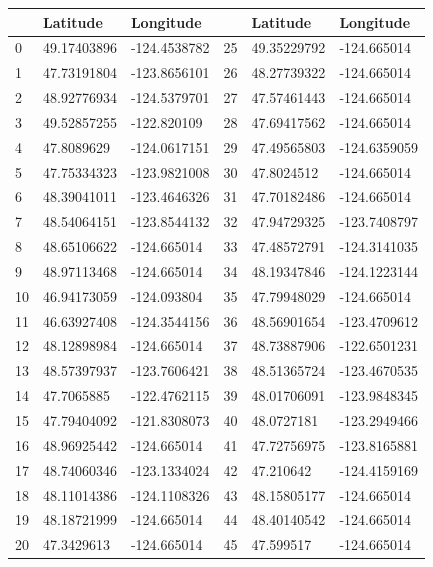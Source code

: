 \documentclass{mcmthesis}
\begin{document}
\begin{appendices}
\begin{table}[htbp]
\centering
\begin{tabular}{|l|l|l|l|l|l|}
\hline
   & Latitude    & Longitude    &    & Latitude    & Longitude    \\ \hline
0  & 49.17403896 & -124.4538782 & 25 & 49.35229792 & -124.665014  \\ \hline
1  & 47.73191804 & -123.8656101 & 26 & 48.27739322 & -124.665014  \\ \hline
2  & 48.92776934 & -124.5379701 & 27 & 47.57461443 & -124.665014  \\ \hline
3  & 49.52857255 & -122.820109  & 28 & 47.69417562 & -124.665014  \\ \hline
4  & 47.8089629  & -124.0617151 & 29 & 47.49565803 & -124.6359059 \\ \hline
5  & 47.75334323 & -123.9821008 & 30 & 47.8024512  & -124.665014  \\ \hline
6  & 48.39041011 & -123.4646326 & 31 & 47.70182486 & -124.665014  \\ \hline
7  & 48.54064151 & -123.8544132 & 32 & 47.94729325 & -123.7408797 \\ \hline
8  & 48.65106622 & -124.665014  & 33 & 47.48572791 & -124.3141035 \\ \hline
9  & 48.97113468 & -124.665014  & 34 & 48.19347846 & -124.1223144 \\ \hline
10 & 46.94173059 & -124.093804  & 35 & 47.79948029 & -124.665014  \\ \hline
11 & 46.63927408 & -124.3544156 & 36 & 48.56901654 & -123.4709612 \\ \hline
12 & 48.12898984 & -124.665014  & 37 & 48.73887906 & -122.6501231 \\ \hline
13 & 48.57397937 & -123.7606421 & 38 & 48.51365724 & -123.4670535 \\ \hline
14 & 47.7065885  & -122.4762115 & 39 & 48.01706091 & -123.9848345 \\ \hline
15 & 47.79404092 & -121.8308073 & 40 & 48.0727181  & -123.2949466 \\ \hline
16 & 48.96925442 & -124.665014  & 41 & 47.72756975 & -123.8165881 \\ \hline
17 & 48.74060346 & -123.1334024 & 42 & 47.210642   & -124.4159169 \\ \hline
18 & 48.11014386 & -124.1108326 & 43 & 48.15805177 & -124.665014  \\ \hline
19 & 48.18721999 & -124.665014  & 44 & 48.40140542 & -124.665014  \\ \hline
20 & 47.3429613  & -124.665014  & 45 & 47.599517   & -124.665014  \\ \hline

\end{tabular}
\end{table}
\end{appendices}
\end{document}

